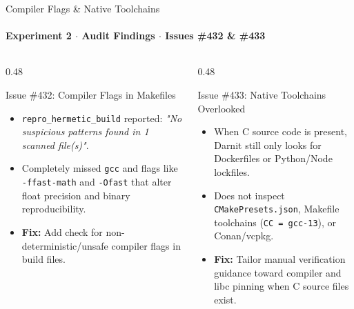 \documentclass[aspectratio=169]{beamer}
\begin{document}
\begin{frame}{Compiler Flags \& Native Toolchains}
    \framesubtitle{Experiment 2 $\cdot$ Audit Findings $\cdot$ Issues \#432 \& \#433}
    \begin{columns}[T]
        \begin{column}{0.48\textwidth}
            \begin{alertblock}{Issue \#432: Compiler Flags in Makefiles}
                \small
                \begin{itemize}
                    \item \texttt{repro\_hermetic\_build} reported: \textit{"No suspicious patterns found in 1 scanned file(s)"}.
                    \item Completely missed \texttt{gcc} and flags like \texttt{-ffast-math} and \texttt{-Ofast} that alter float precision and binary reproducibility.
                    \item \textbf{Fix:} Add check for non-deterministic/unsafe compiler flags in build files.
                \end{itemize}
            \end{alertblock}
        \end{column}
        \begin{column}{0.48\textwidth}
            \begin{block}{Issue \#433: Native Toolchains Overlooked}
                \small
                \begin{itemize}
                    \item When C source code is present, Darnit still only looks for Dockerfiles or Python/Node lockfiles.
                    \item Does not inspect \texttt{CMakePresets.json}, Makefile toolchains (\texttt{CC = gcc-13}), or Conan/vcpkg.
                    \item \textbf{Fix:} Tailor manual verification guidance toward compiler and libc pinning when C source files exist.
                \end{itemize}
            \end{block}
        \end{column}
    \end{columns}
\end{frame}
\end{document}
